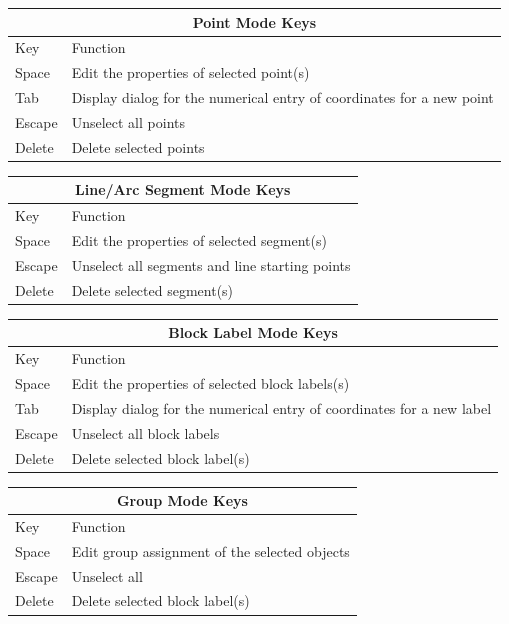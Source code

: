 \documentclass[12pt]{report}
\begin{document}
\begin{table}
\centering
\begin{tabular}{|l|l|} \hline \hline
\multicolumn{2}{|c|}{Point Mode Keys} \\ \hline \hline
 Key    & Function \\ \hline \hline
 Space  & Edit the properties of selected point(s) \\ \hline
 Tab    & Display dialog for the numerical entry of coordinates for a new point \\ \hline
 Escape & Unselect all points \\ \hline
 Delete & Delete selected points \\ \hline \hline
\end{tabular}

\vspace*{12pt}
\begin{tabular}{|l|l|} \hline \hline
\multicolumn{2}{|c|}{Line/Arc Segment Mode Keys} \\ \hline \hline
 Key    & Function \\ \hline \hline
 Space  & Edit the properties of selected segment(s) \\ \hline
 Escape & Unselect all segments and line starting points \\ \hline
 Delete & Delete selected segment(s) \\ \hline \hline
\end{tabular}

\vspace*{12pt}
\begin{tabular}{|l|l|} \hline \hline
\multicolumn{2}{|c|}{Block Label Mode Keys} \\ \hline \hline
 Key    & Function \\ \hline \hline
 Space  & Edit the properties of selected block labels(s) \\ \hline
 Tab    & Display dialog for the numerical entry of coordinates for a new label \\ \hline
 Escape & Unselect all block labels  \\ \hline
 Delete & Delete selected block label(s) \\ \hline \hline
\end{tabular}

\vspace*{12pt}
\begin{tabular}{|l|l|} \hline \hline
\multicolumn{2}{|c|}{Group Mode Keys} \\ \hline \hline
 Key    & Function \\ \hline \hline
 Space  & Edit group assignment of the selected objects \\ \hline
 Escape & Unselect all  \\ \hline
 Delete & Delete selected block label(s) \\ \hline \hline
\end{tabular}


\end{table}
\end{document}
